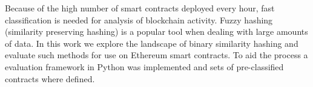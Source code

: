 \documentclass[../main.tex]{subfiles}
\begin{document}
Because of the high number of smart contracts deployed every hour, fast classification is needed for analysis of blockchain activity.
Fuzzy hashing (similarity preserving hashing) is a popular tool when dealing with large amounts of data.
In this work we explore the landscape of binary similarity hashing and evaluate such methods for use on Ethereum smart contracts.
To aid the process a evaluation framework in Python was implemented and sets of pre-classified contracts where defined.
\end{document}
